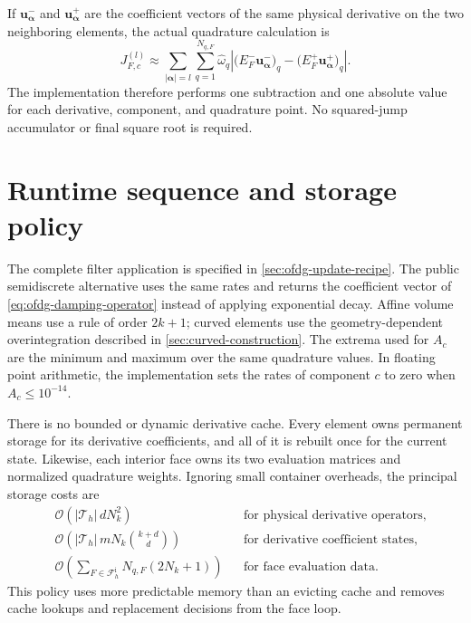 If $\boldsymbol{u}_{\boldsymbol{\alpha}}^-$ and
$\boldsymbol{u}_{\boldsymbol{\alpha}}^+$ are the coefficient vectors of the
same physical derivative on the two neighboring elements, the actual quadrature
calculation is
\begin{equation}
  J_{F,c}^{(l)}
  \approx\sum_{|\boldsymbol{\alpha}|=l}\sum_{q=1}^{N_{q,F}}
  \widehat{\omega}_q
  \left|
    \bigl(E_F^-\boldsymbol{u}_{\boldsymbol{\alpha}}^-\bigr)_q
    -\bigl(E_F^+\boldsymbol{u}_{\boldsymbol{\alpha}}^+\bigr)_q
  \right|.
  \label{eq:ofdg-discrete-face-jump}
\end{equation}
The implementation therefore performs one subtraction and one absolute value for
each derivative, component, and quadrature point.  No squared-jump accumulator or
final square root is required.

\section{Runtime sequence and storage policy}

The complete filter application is specified in
\cref{sec:ofdg-update-recipe}. The public semidiscrete alternative uses the
same rates and returns the coefficient vector of
\cref{eq:ofdg-damping-operator} instead of applying exponential decay.
Affine volume means use a rule of order $2k+1$; curved elements use the geometry-dependent overintegration described in \cref{sec:curved-construction}.  The extrema used for
$A_c$ are the minimum and maximum over the same quadrature values.  In floating
point arithmetic, the implementation sets the rates of component $c$ to zero when
$A_c\leq 10^{-14}$.

There is no bounded or dynamic derivative cache.  Every element owns permanent
storage for its derivative coefficients, and all of it is rebuilt once for the
current state.  Likewise, each interior face owns its two evaluation matrices and
normalized quadrature weights.  Ignoring small container overheads, the principal
storage costs are
\begin{align}
  &\mathcal{O}\left(
    |\mathcal{T}_h|\,dN_k^2
    \right)
  &&\text{for physical derivative operators},\\
  &\mathcal{O}\left(
    |\mathcal{T}_h|\,mN_k\binom{k+d}{d}
    \right)
  &&\text{for derivative coefficient states},\\
  &\mathcal{O}\left(
    \sum_{F\in\mathcal{F}_h^{\mathrm{i}}}N_{q,F}(2N_k+1)
    \right)
  &&\text{for face evaluation data}.
\end{align}
This policy uses more predictable memory than an evicting cache and removes cache
lookups and replacement decisions from the face loop.

